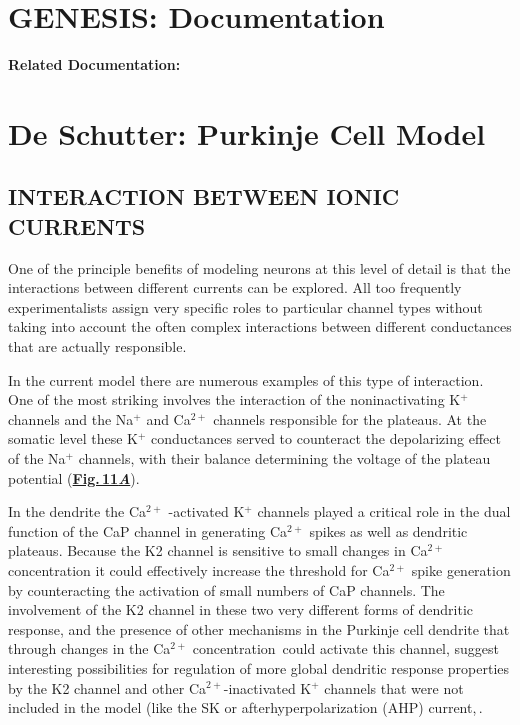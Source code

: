\documentclass[12pt]{article}
\begin{document}
\section*{GENESIS: Documentation}

{\bf Related Documentation:}

\section*{De Schutter: Purkinje Cell Model}

\subsection*{INTERACTION BETWEEN IONIC CURRENTS}

One of the principle
benefits of modeling neurons at this level of detail is that
the interactions between different currents can be explored.
All too frequently experimentalists assign very specific roles
to particular channel types without taking into account the
often complex interactions between different conductances
that are actually responsible.

In the current model there are numerous examples of this
type of interaction. One of the most striking involves the
interaction of the noninactivating K$^+$ channels and the
Na$^+$ and Ca$^{2+}$ channels responsible for the plateaus. At the
somatic level these K$^+$ conductances served to counteract
the depolarizing effect of the Na$^+$ channels, with their balance
determining the voltage of the plateau potential
(\href{../pub-purkinje-deschutter1-fig-11/pub-purkinje-deschutter1-fig-11.tex}{\bf Fig.\,11{\it A}}).

In the dendrite the Ca$^{2+}$ -activated K$^+$ channels played a
critical role in the dual function of the CaP channel in generating
Ca$^{2+}$ spikes as well as dendritic plateaus. Because
the K2 channel is sensitive to small changes in Ca$^{2+}$ concentration
it could effectively increase the threshold for
Ca$^{2+}$ spike generation by counteracting the activation of
small numbers of CaP channels. The involvement of the
K2 channel in these two very different forms of dendritic
response, and the presence of other mechanisms in the Purkinje
cell dendrite that through changes in the Ca$^{2+}$ concentration\,\cite{Llano:1991kx, Takei:1992ac}
could activate
this channel, suggest interesting possibilities for regulation
of more global dendritic response properties by the K2
channel and other Ca$^{2+}$-inactivated K$^+$ channels that were
not included in the model (like the SK or afterhyperpolarization
(AHP) current,\,\cite{Lancaster:1991ye}.
\end{document}
